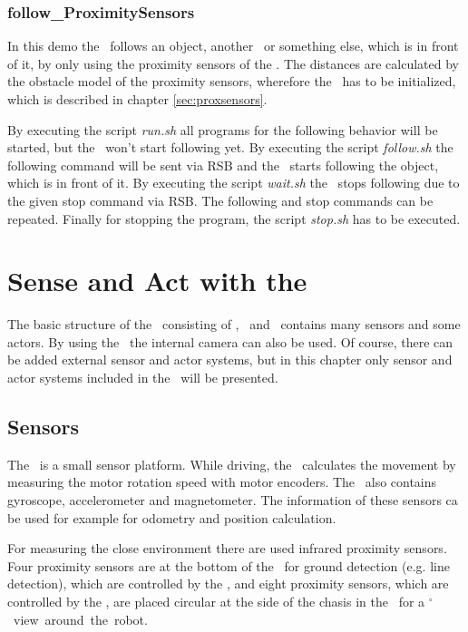 \subsection{follow\_ProximitySensors}

In this demo the \amiro\ follows an object, another \amiro\ or something else, which is in front of it, by only using the proximity sensors of the \proxring. The distances are calculated by the obstacle model of the proximity sensors, wherefore the \proxring\ has to be initialized, which is described in chapter \ref{sec:proxsensors}.

By executing the script {\it run.sh} all programs for the following behavior will be started, but the \amiro\ won't start following yet. By executing the script {\it follow.sh} the following command will be sent via RSB and the \amiro\ starts following the object, which is in front of it. By executing the script {\it wait.sh} the \amiro\ stops following due to the given stop command via RSB. The following and stop commands can be repeated. Finally for stopping the program, the script {\it stop.sh} has to be executed.

\chapter{Sense and Act with the \amiro}

The basic structure of the \amiro\ consisting of \diwheel, \power\ and \light\ contains many sensors and some actors. By using the \cognition\ the internal camera can also be used. Of course, there can be added external sensor and actor systems, but in this chapter only sensor and actor systems included in the \amiro\ will be presented.

\section{Sensors}
\label{sec:sensors}

The \amiro\ is a small sensor platform. While driving, the \diwheel\ calculates the movement by measuring the motor rotation speed with motor encoders. The \diwheel\ also contains gyroscope, accelerometer and magnetometer. The information of these sensors ca be used for example for odometry and position calculation.

For measuring the close environment there are used infrared proximity sensors. Four proximity sensors are at the bottom of the \amiro\ for ground detection (e.g. line detection), which are controlled by the \diwheel, and eight proximity sensors, which are controlled by the \power, are placed circular at the side of the chasis in the \proxring\ for a \unit[360]{$^{\circ}$} view around the robot.

